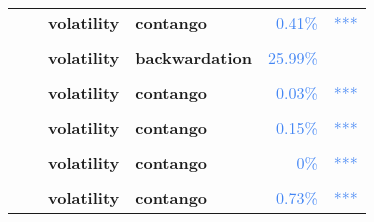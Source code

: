 \documentclass[
  authoryear,
  preprint,
  3p]{elsarticle}
\begin{document}
\begin{longtable}[t]{>{}l>{}l>{}l>{}l>{}r>{}r}
\textbf{} & \textbf{} & \textbf{volatility} & \textbf{contango} & \textcolor[HTML]{4285f4}{0.41\%} & \textcolor[HTML]{4285f4}{***}\\
\textbf{\cellcolor{gray!10}{}} & \textbf{\cellcolor{gray!10}{post-crisis}} & \textbf{\cellcolor{gray!10}{mean}} & \textbf{\cellcolor{gray!10}{backwardation}} & \textcolor[HTML]{4285f4}{\cellcolor{gray!10}{1.33\%}} & \textcolor[HTML]{4285f4}{\cellcolor{gray!10}{**}}\\
\textbf{} & \textbf{} & \textbf{volatility} & \textbf{backwardation} & \textcolor[HTML]{4285f4}{25.99\%} & \textcolor[HTML]{4285f4}{}\\
\addlinespace
\textbf{\cellcolor{gray!10}{Copper (XLME)}} & \textbf{\cellcolor{gray!10}{past}} & \textbf{\cellcolor{gray!10}{mean}} & \textbf{\cellcolor{gray!10}{backwardation}} & \textcolor[HTML]{4285f4}{\cellcolor{gray!10}{88.51\%}} & \textcolor[HTML]{4285f4}{\cellcolor{gray!10}{}}\\
\textbf{} & \textbf{} & \textbf{volatility} & \textbf{contango} & \textcolor[HTML]{4285f4}{0.03\%} & \textcolor[HTML]{4285f4}{***}\\
\textbf{\cellcolor{gray!10}{}} & \textbf{\cellcolor{gray!10}{financialisation}} & \textbf{\cellcolor{gray!10}{mean}} & \textbf{\cellcolor{gray!10}{contango}} & \textcolor[HTML]{4285f4}{\cellcolor{gray!10}{87.59\%}} & \textcolor[HTML]{4285f4}{\cellcolor{gray!10}{}}\\
\textbf{} & \textbf{} & \textbf{volatility} & \textbf{contango} & \textcolor[HTML]{4285f4}{0.15\%} & \textcolor[HTML]{4285f4}{***}\\
\textbf{\cellcolor{gray!10}{}} & \textbf{\cellcolor{gray!10}{crisis}} & \textbf{\cellcolor{gray!10}{mean}} & \textbf{\cellcolor{gray!10}{backwardation}} & \textcolor[HTML]{4285f4}{\cellcolor{gray!10}{43.61\%}} & \textcolor[HTML]{4285f4}{\cellcolor{gray!10}{}}\\
\addlinespace
\textbf{} & \textbf{} & \textbf{volatility} & \textbf{contango} & \textcolor[HTML]{4285f4}{0\%} & \textcolor[HTML]{4285f4}{\vphantom{8} ***}\\
\textbf{\cellcolor{gray!10}{}} & \textbf{\cellcolor{gray!10}{post-crisis}} & \textbf{\cellcolor{gray!10}{mean}} & \textbf{\cellcolor{gray!10}{backwardation}} & \textcolor[HTML]{4285f4}{\cellcolor{gray!10}{16.36\%}} & \textcolor[HTML]{4285f4}{\cellcolor{gray!10}{}}\\
\textbf{} & \textbf{} & \textbf{volatility} & \textbf{contango} & \textcolor[HTML]{4285f4}{0.73\%} & \textcolor[HTML]{4285f4}{***}\\

\end{longtable}
\end{document}
